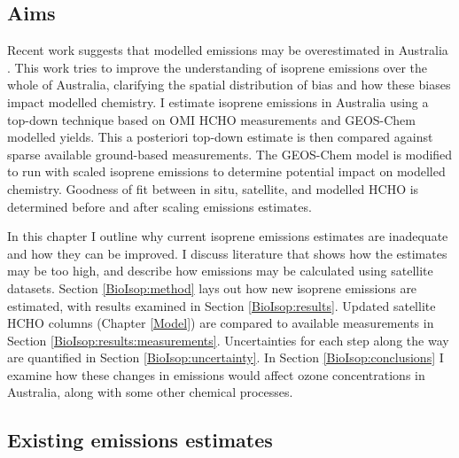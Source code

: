   \subsection{Aims}
    \label{BioIsop:intro:aims}
    
    Recent work suggests that modelled emissions may be overestimated in Australia \parencite{Emmerson2016}.
    This work tries to improve the understanding of isoprene emissions over the whole of Australia, clarifying the spatial distribution of bias and how these biases impact modelled chemistry.
    I estimate isoprene emissions in Australia using a top-down technique based on OMI HCHO measurements and GEOS-Chem modelled yields.
    This a posteriori top-down estimate is then compared against sparse available ground-based measurements.
    The GEOS-Chem model is modified to run with scaled isoprene emissions to determine potential impact on modelled chemistry.
    Goodness of fit between in situ, satellite, and modelled HCHO is determined before and after scaling emissions estimates.
    
    
    In this chapter I outline why current isoprene emissions estimates are inadequate and how they can be improved.
    I discuss literature that shows how the estimates may be too high, and describe how emissions may be calculated using satellite datasets.
    Section \ref{BioIsop:method} lays out how new isoprene emissions are estimated, with results examined in Section \ref{BioIsop:results}. 
    Updated satellite HCHO columns (Chapter \ref{Model}) are compared to available measurements in Section \ref{BioIsop:results:measurements}.
    Uncertainties for each step along the way are quantified in Section \ref{BioIsop:uncertainty}.
    In Section \ref{BioIsop:conclusions} I examine how these changes in emissions would affect ozone concentrations in Australia, along with some other chemical processes.
    
    
  \subsection{Existing emissions estimates}
    

